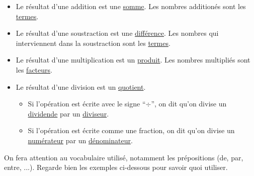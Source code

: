 \documentclass[../€Cours-complet/Cours-complet]{subfiles}
\begin{document}
\maketitleCours

\begin{cours}[Vocabulaire]
	\begin{itemize}
		\item Le résultat d'une addition est une \uline{somme}. Les nombres additionés sont les \uline{termes}.
		\item Le résultat d'une soustraction est une \uline{différence}. Les nombres qui interviennent dans la soustraction sont les \uline{termes}.
		\item Le résultat d'une multiplication est un \uline{produit}. Les nombres multipliés sont les \uline{facteurs}.
		\item Le résultat d'une division est un \uline{quotient}.
		      \begin{itemize}
			      \item Si l'opération est écrite avec le signe “$÷$”, on dit qu'on divise un \uline{dividende} par un \uline{diviseur}.
			      \item Si l'opération est écrite comme une fraction, on dit qu'on divise un \uline{numérateur} par un \uline{dénominateur}.
		      \end{itemize}
	\end{itemize} \vspace{1em}

	On fera attention au vocabulaire utilisé, notamment les prépositions (de, par, entre, ...). Regarde bien les exemples ci-dessous pour savoir quoi utiliser.
\end{cours}
\end{document}
